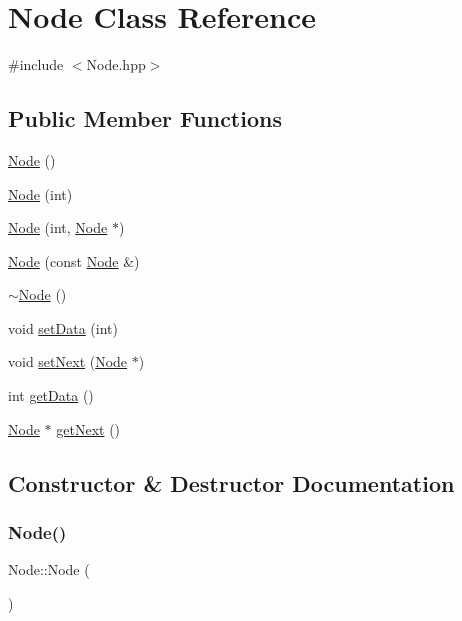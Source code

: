 \hypertarget{class_node}{}\section{Node Class Reference}
\label{class_node}


{\ttfamily \#include $<$Node.\+hpp$>$}

\subsection*{Public Member Functions}
\begin{DoxyCompactItemize}
\item 
\hyperlink{class_node_ad7a34779cad45d997bfd6d3d8043c75f}{Node} ()
\item 
\hyperlink{class_node_aff71d952af8363f046a67a8b12194e46}{Node} (int)
\item 
\hyperlink{class_node_aff31c12e14a6f00952a46ff967db0c96}{Node} (int, \hyperlink{class_node}{Node} $\ast$)
\item 
\hyperlink{class_node_a4053c6deca192c41824fad14c4f4eb76}{Node} (const \hyperlink{class_node}{Node} \&)
\item 
\hyperlink{class_node_aa0840c3cb5c7159be6d992adecd2097c}{$\sim$\+Node} ()
\item 
void \hyperlink{class_node_a0a2c821ab31b604e4fdd7cf39be5cc68}{set\+Data} (int)
\item 
void \hyperlink{class_node_a89b12aca90acdf6a8a547cbdab9b80a5}{set\+Next} (\hyperlink{class_node}{Node} $\ast$)
\item 
int \hyperlink{class_node_aca98907146d5d0687f48bf8be9df9b7d}{get\+Data} ()
\item 
\hyperlink{class_node}{Node} $\ast$ \hyperlink{class_node_ae36639ff267d63e058ce309fde5a9913}{get\+Next} ()
\end{DoxyCompactItemize}


\subsection{Constructor \& Destructor Documentation}
\mbox{\label{class_node_ad7a34779cad45d997bfd6d3d8043c75f}} 
\subsubsection{\texorpdfstring{Node()}{Node()}\hspace{0.1cm}{\footnotesize\ttfamily [1/4]}}
{\footnotesize\ttfamily Node\+::\+Node (\begin{DoxyParamCaption}{ }\end{DoxyParamCaption})}

